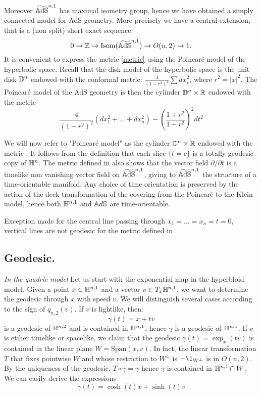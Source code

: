 Moreover $\widetilde{\mathbb{A}\mathrm{d}\mathbb{S}}^{n,1}$ has maximal isometry group, hence we have obtained a simply connected model for AdS geometry. More precisely we have a central extension, that is a (non split) short exact sequence:
\[
    0\to \mathbb{Z}\to \textnormal{Isom}(\widetilde{\mathbb{A}\mathrm{d}\mathbb{S}}^{n,1})\to O(n,2)\to 1.
\]
It is convenient to express the metric \ref{metric} using the Poincaré model of the hyperbolic space. Recall that the disk model of the hyperbolic space is the unit disk $\mathbb{D}^n$ endowed with the conformal metric: $\frac{4}{(1-r^2)^2}\sum dx_i^2$, where $r^2=\vert x\vert^2$. 
The Poincaré model of the AdS geometry is then the cylinder $\mathbb{D}^n\times \mathbb{R}$ endowed with the metric 
\begin{equation}\label{metricdisk}
    \frac{4}{(1-r^2)^2}(dx_1^2+\dots+dx_n^2)-(\frac{1+r^2}{1-r^2})^{2}dt^2 
\end{equation}

We will now refer to "Poincaré model" as the cylinder $\mathbb{D}^n\times \mathbb{R}$ endowed with the metric . It follows from the definition that each slice $\{t=c\}$ is a totally geodesic copy of $\mathbb{H}^n$. The metric defined in  also shows that the vector field $\partial/\partial t$ is a timelike non vanishing vector field on $\widetilde{\mathbb{A}\mathrm{d}\mathbb{S}}^{n,1}$, giving to $\widetilde{\mathbb{A}\mathrm{d}\mathbb{S}}^{n,1}$ the structure of a time-orientable manifold. Any choice of time orientation is preserved by the action of the deck transformation of the covering from the Poincaré to the Klein model, hence both $\mathbb{H}^{n,1}$ and $\mathbb{A}d\mathbb{S}$ are time-orientable. \\
\begin{observation}
    Exception made for the central line passing through $x_1=\dots=x_n=t=0,$ vertical lines are not geodesic for the metric defined in .  
\end{observation}

\subsection{Geodesic.}

\textit{In the quadric model} Let us start with the exponential map in the hyperbloid model. Given a point $x\in \mathbb{H}^{n,1}$ and a vector $v\in T_x\mathbb{H}^{n,1}$, we want to determine the geodesic through $x$ with speed $v$. We will distinguish several cases according to the sign of $ q_{n,2}(v)$. If $v$ is lightlike, then: 
\[
    \gamma(t)=x+tv
\] is a geodesic of $\mathbb{R}^{n,2}$ and is contained in $\mathbb{H}^{n,1}$, hence $\gamma$ is a geodesic of $\mathbb{H}^{n,1}$. If $v$ is etiher timelike or spacelike, we claim that the geodesic $\gamma(t)=\exp_x(tv)$ is contained in the linear plane $W=\text{Span}(x,v).$ In fact, the linear transformation $T$ that fixes pointwise $W$ and whose restriction to $W^\perp$ is $-\1_{W^\perp}$ is in $O(n,2)$. By the uniqueness of the geodesic, $T\circ\gamma=\gamma$ hence $\gamma$ is contained in $\mathbb{H}^{n,1}\cap W$. We can easily derive the expressions\\
\begin{equation}
    \gamma(t)=\cosh(t)x+\sinh(t)v
\end{equation}

